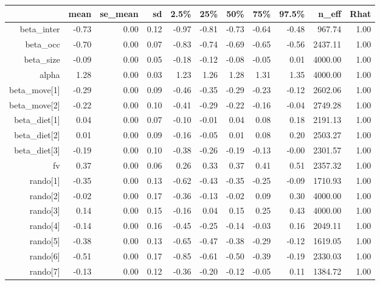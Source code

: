\begin{table}[ht]
\centering
\begin{tabular}{rrrrrrrrrrr}
  \hline
 & mean & se\_mean & sd & 2.5\% & 25\% & 50\% & 75\% & 97.5\% & n\_eff & Rhat \\ 
  \hline
beta\_inter & -0.73 & 0.00 & 0.12 & -0.97 & -0.81 & -0.73 & -0.64 & -0.48 & 967.74 & 1.00 \\ 
  beta\_occ & -0.70 & 0.00 & 0.07 & -0.83 & -0.74 & -0.69 & -0.65 & -0.56 & 2437.11 & 1.00 \\ 
  beta\_size & -0.09 & 0.00 & 0.05 & -0.18 & -0.12 & -0.08 & -0.05 & 0.01 & 4000.00 & 1.00 \\ 
  alpha & 1.28 & 0.00 & 0.03 & 1.23 & 1.26 & 1.28 & 1.31 & 1.35 & 4000.00 & 1.00 \\ 
  beta\_move[1] & -0.29 & 0.00 & 0.09 & -0.46 & -0.35 & -0.29 & -0.23 & -0.12 & 2602.06 & 1.00 \\ 
  beta\_move[2] & -0.22 & 0.00 & 0.10 & -0.41 & -0.29 & -0.22 & -0.16 & -0.04 & 2749.28 & 1.00 \\ 
  beta\_diet[1] & 0.04 & 0.00 & 0.07 & -0.10 & -0.01 & 0.04 & 0.08 & 0.18 & 2191.13 & 1.00 \\ 
  beta\_diet[2] & 0.01 & 0.00 & 0.09 & -0.16 & -0.05 & 0.01 & 0.08 & 0.20 & 2503.27 & 1.00 \\ 
  beta\_diet[3] & -0.19 & 0.00 & 0.10 & -0.38 & -0.26 & -0.19 & -0.13 & -0.00 & 2301.57 & 1.00 \\ 
  fv & 0.37 & 0.00 & 0.06 & 0.26 & 0.33 & 0.37 & 0.41 & 0.51 & 2357.32 & 1.00 \\ 
  rando[1] & -0.35 & 0.00 & 0.13 & -0.62 & -0.43 & -0.35 & -0.25 & -0.09 & 1710.93 & 1.00 \\ 
  rando[2] & -0.02 & 0.00 & 0.17 & -0.36 & -0.13 & -0.02 & 0.09 & 0.30 & 4000.00 & 1.00 \\ 
  rando[3] & 0.14 & 0.00 & 0.15 & -0.16 & 0.04 & 0.15 & 0.25 & 0.43 & 4000.00 & 1.00 \\ 
  rando[4] & -0.14 & 0.00 & 0.16 & -0.45 & -0.25 & -0.14 & -0.03 & 0.16 & 2049.11 & 1.00 \\ 
  rando[5] & -0.38 & 0.00 & 0.13 & -0.65 & -0.47 & -0.38 & -0.29 & -0.12 & 1619.05 & 1.00 \\ 
  rando[6] & -0.51 & 0.00 & 0.17 & -0.85 & -0.61 & -0.50 & -0.39 & -0.19 & 2330.03 & 1.00 \\ 
  rando[7] & -0.13 & 0.00 & 0.12 & -0.36 & -0.20 & -0.12 & -0.05 & 0.11 & 1384.72 & 1.00 \\ 

\end{tabular}
\end{table}
